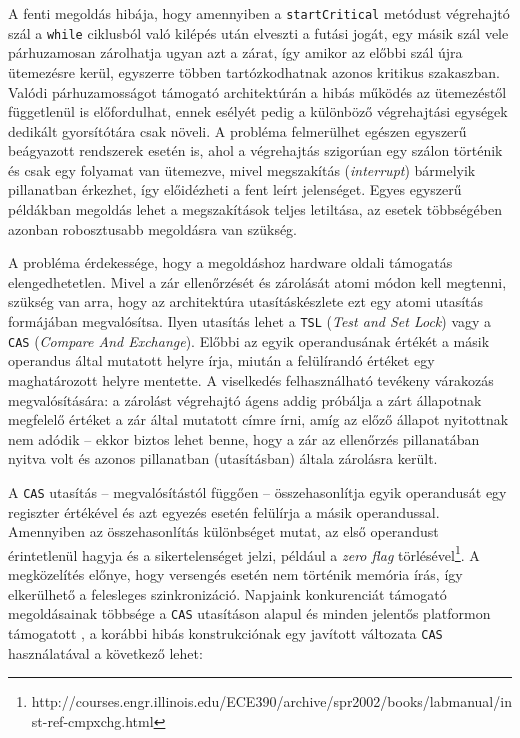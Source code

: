     A fenti megoldás hibája, hogy amennyiben a \texttt{startCritical} metódust végrehajtó szál a \texttt{while} ciklusból való kilépés után elveszti a futási jogát, egy másik szál vele párhuzamosan zárolhatja ugyan azt a zárat, így amikor az előbbi szál újra ütemezésre kerül, egyszerre többen tartózkodhatnak azonos kritikus szakaszban. Valódi párhuzamosságot támogató architektúrán a hibás működés az ütemezéstől függetlenül is előfordulhat, ennek esélyét pedig a különböző végrehajtási egységek dedikált gyorsítótára csak növeli. A probléma felmerülhet egészen egyszerű beágyazott rendszerek esetén is, ahol a végrehajtás szigorúan egy szálon történik és csak egy folyamat van ütemezve, mivel megszakítás (\emph{interrupt}) bármelyik pillanatban érkezhet, így előidézheti a fent leírt jelenséget. Egyes egyszerű példákban megoldás lehet a megszakítások teljes letiltása, az esetek többségében azonban robosztusabb megoldásra van szükség.
    
    A probléma érdekessége, hogy a megoldáshoz hardware oldali támogatás elengedhetetlen. Mivel a zár ellenőrzését és zárolását atomi módon kell megtenni, szükség van arra, hogy az architektúra utasításkészlete ezt egy atomi utasítás formájában megvalósítsa. Ilyen utasítás lehet a \texttt{TSL} (\emph{Test and Set Lock}) vagy a \texttt{CAS} (\emph{Compare And Exchange}). Előbbi az egyik operandusának értékét a másik operandus által mutatott helyre írja, miután a felülírandó értéket egy maghatározott helyre mentette. A viselkedés felhasználható tevékeny várakozás megvalósítására: a zárolást végrehajtó ágens addig próbálja a zárt állapotnak megfelelő értéket a zár által mutatott címre írni, amíg az előző állapot nyitottnak nem adódik -- ekkor biztos lehet benne, hogy a zár az ellenőrzés pillanatában nyitva volt és azonos pillanatban (utasításban) általa zárolásra került.
    
    A \texttt{CAS} utasítás -- megvalósítástól függően -- összehasonlítja egyik operandusát egy regiszter értékével és azt egyezés esetén felülírja a másik operandussal. Amennyiben az összehasonlítás különbséget mutat, az első operandust érintetlenül hagyja és a sikertelenséget jelzi, például a \emph{zero flag} törlésével\footnote{http://courses.engr.illinois.edu/ECE390/archive/spr2002/books/labmanual/inst-ref-cmpxchg.html}. A megközelítés előnye, hogy versengés esetén nem történik memória írás, így elkerülhető a felesleges szinkronizáció. Napjaink konkurenciát támogató megoldásainak többsége a \texttt{CAS} utasításon alapul és minden jelentős platformon támogatott \cite{DiceEtAl}, a korábbi hibás konstrukciónak egy javított változata \texttt{CAS} használatával a következő lehet:
    
